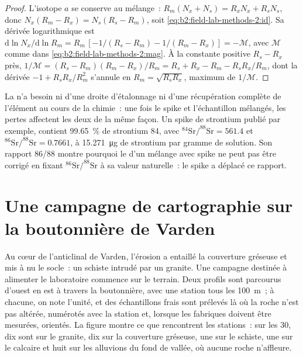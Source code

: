 \begin{proof}
L'isotope $a$ se conserve au mélange~: $R_m(N_x + N_s) = R_x N_x + R_s N_s$, donc $N_x(R_m - R_x) =
N_s(R_s - R_m)$, soit \eqref{eq:b2:field-lab-methods-2:id}. Sa dérivée logarithmique est
$\mathrm{d}\ln N_x/\mathrm{d}\ln R_m = R_m\,[-1/(R_s - R_m) - 1/(R_m - R_x)] = -\mathcal{M}$, avec
$\mathcal{M}$ comme dans \eqref{eq:b2:field-lab-methods-2:mag}. À la constante positive $R_s - R_x$ près,
$1/\mathcal{M} = (R_s - R_m)(R_m - R_x)/R_m = R_s + R_x - R_m - R_sR_x/R_m$, dont la dérivée
$-1 + R_sR_x/R_m^2$ s'annule en $R_m = \sqrt{R_sR_x}$, maximum de $1/\mathcal{M}$.
\end{proof}

La  n'a besoin ni d'une droite d'étalonnage ni d'une récupération complète de l'élément au cours de
la chimie~: une fois le spike et l'échantillon mélangés, les pertes affectent les deux de la même façon. Un spike de strontium publié
par exemple, contient \qty{99.65}{\percent} de strontium 84, avec
$^{84}\mathrm{Sr}/^{88}\mathrm{Sr} = 561.4$ et $^{86}\mathrm{Sr}/^{88}\mathrm{Sr} = 0.7661$, à
\qty{15.271}{\micro\gram} de strontium par gramme de solution. Son rapport 86/88 montre pourquoi le  d'un mélange avec spike ne peut pas être corrigé en fixant $^{86}\mathrm{Sr}/^{88}\mathrm{Sr}$ à sa
valeur naturelle~: le spike a déplacé ce rapport.

\section{Une campagne de cartographie sur la boutonnière de Varden}\label{sec:b2:field-lab-methods-2:campaign}

Au cœur de l'anticlinal de Varden, l'érosion a entaillé la couverture gréseuse et mis à nu le socle~: un schiste
intrudé par un granite. Une campagne destinée à alimenter le laboratoire commence sur le terrain. Deux profils
sont parcourus d'ouest en est à travers la boutonnière, avec une station tous les
\qty{100}{m}~; à chacune, on note l'unité, et des échantillons frais sont prélevés là où la roche n'est pas altérée,
numérotés avec la station et, lorsque les fabriques doivent être mesurées, orientés. La figure montre ce que
rencontrent les stations~: sur les 30, dix sont sur le granite, dix sur la couverture gréseuse, une sur le schiste,
une sur le calcaire et huit sur les alluvions du fond de vallée, où aucune roche
n'affleure.

